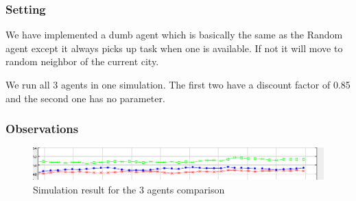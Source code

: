 \documentclass[11pt]{article}
\begin{document}
\subsubsection{Setting}
We have implemented a dumb agent which is basically the same as the
Random agent except it always picks up task when one is available. If
not it will move to random neighbor of the current city.

We run all 3 agents in one simulation. The first two have a discount
factor of 0.85 and the second one has no parameter.

\subsubsection{Observations}
\begin{figure}
  \caption{Simulation result for the 3 agents comparison}
  \includegraphics{compare_3}
\end{figure}
\end{document}
